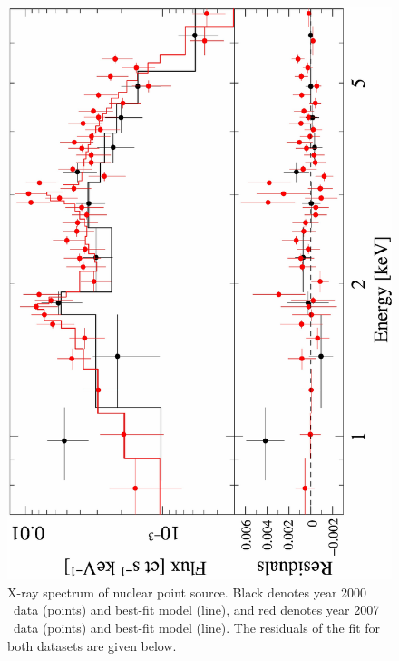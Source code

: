 \begin{figure}
  \begin{center}
    \begin{minipage}{0.5\linewidth}
      \includegraphics*[width=\textwidth, angle=-90]{arx_nucspec.ps}
    \end{minipage}
    \caption{X-ray spectrum of nuclear point source. Black denotes
      year 2000 \cxo\ data (points) and best-fit model (line), and red
      denotes year 2007 \cxo\ data (points) and best-fit model (line).
      The residuals of the fit for both datasets are given below.}
    \label{fig:nucspec}
  \end{center}
\end{figure}

